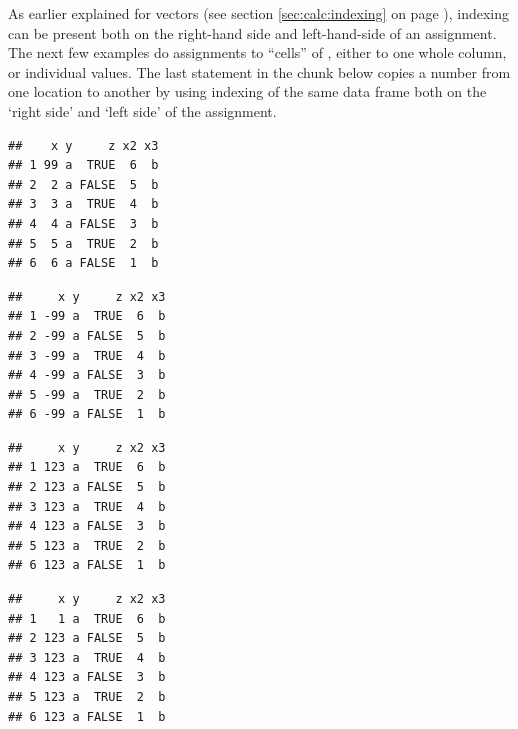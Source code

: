 \documentclass[krantz2]{krantz}\usepackage{knitr}%
\begin{document}
As earlier explained for vectors (see section \ref{sec:calc:indexing} on page \pageref{sec:calc:indexing}), indexing can be present both on the right-hand side and left-hand-side of an assignment.
The next few examples do assignments to ``cells'' of , either to one whole column, or individual values. The last statement in the chunk below copies a number from one location to another by using indexing of the same data frame both on the `right side' and `left side' of the assignment.\qRoperator{[[]]}\qRoperator{[]}

\begin{knitrout}\footnotesize
{}\color{fgcolor}\begin{kframe}
\begin{alltt}
\hlstd{a.df[}\hlstd{,} \hlstd{]} \hlkwb{<-} 
\end{alltt}
\begin{verbatim}
##    x y     z x2 x3
## 1 99 a  TRUE  6  b
## 2  2 a FALSE  5  b
## 3  3 a  TRUE  4  b
## 4  4 a FALSE  3  b
## 5  5 a  TRUE  2  b
## 6  6 a FALSE  1  b
\end{verbatim}
\begin{alltt}
\hlstd{a.df[ ,} \hlstd{]} \hlkwb{<-} \hlopt{-}
\end{alltt}
\begin{verbatim}
##     x y     z x2 x3
## 1 -99 a  TRUE  6  b
## 2 -99 a FALSE  5  b
## 3 -99 a  TRUE  4  b
## 4 -99 a FALSE  3  b
## 5 -99 a  TRUE  2  b
## 6 -99 a FALSE  1  b
\end{verbatim}
\begin{alltt}
\hlstd{a.df[[}\hlstd{]]} \hlkwb{<-} 
\end{alltt}
\begin{verbatim}
##     x y     z x2 x3
## 1 123 a  TRUE  6  b
## 2 123 a FALSE  5  b
## 3 123 a  TRUE  4  b
## 4 123 a FALSE  3  b
## 5 123 a  TRUE  2  b
## 6 123 a FALSE  1  b
\end{verbatim}
\begin{alltt}
\hlstd{a.df[}\hlstd{,} \hlstd{]} \hlkwb{<-} \hlstd{a.df[}\hlstd{,} \hlstd{]}
\end{alltt}
\begin{verbatim}
##     x y     z x2 x3
## 1   1 a  TRUE  6  b
## 2 123 a FALSE  5  b
## 3 123 a  TRUE  4  b
## 4 123 a FALSE  3  b
## 5 123 a  TRUE  2  b
## 6 123 a FALSE  1  b
\end{verbatim}
\end{kframe}
\end{knitrout}
\end{document}
